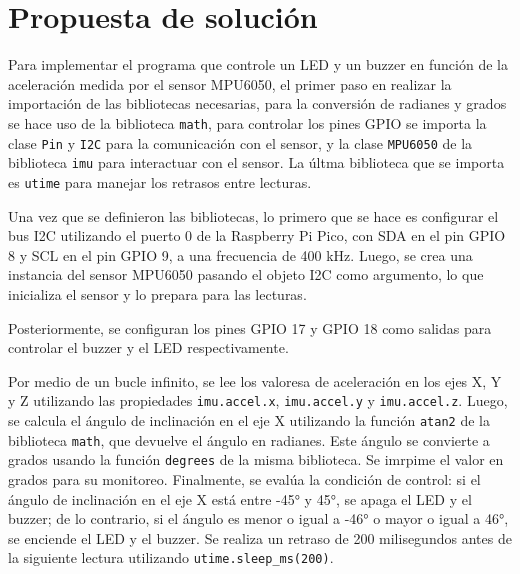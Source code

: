 \documentclass[letterpaper,12pt]{article}
\begin{document}
    \section*{Propuesta de solución}

    Para implementar el programa que controle un LED y un buzzer en función de la aceleración medida por el sensor MPU6050, el primer paso en realizar la importación de las bibliotecas necesarias, para la conversión de radianes y grados se hace uso de la biblioteca \texttt{math}, para controlar los pines GPIO se importa la clase \texttt{Pin} y \texttt{I2C} para la comunicación con el sensor, y la clase \texttt{MPU6050} de la biblioteca \texttt{imu} para interactuar con el sensor. La últma biblioteca que se importa es \texttt{utime} para manejar los retrasos entre lecturas.

    Una vez que se definieron las bibliotecas, lo primero que se hace es configurar el bus I2C utilizando el puerto 0 de la Raspberry Pi Pico, con SDA en el pin GPIO 8 y SCL en el pin GPIO 9, a una frecuencia de 400 kHz. Luego, se crea una instancia del sensor MPU6050 pasando el objeto I2C como argumento, lo que inicializa el sensor y lo prepara para las lecturas.

    Posteriormente, se configuran los pines GPIO 17 y GPIO 18 como salidas para controlar el buzzer y el LED respectivamente.

    Por medio de un bucle infinito, se lee los valoresa de aceleración en los ejes X, Y y Z utilizando las propiedades \texttt{imu.accel.x}, \texttt{imu.accel.y} y \texttt{imu.accel.z}. Luego, se calcula el ángulo de inclinación en el eje X utilizando la función \texttt{atan2} de la biblioteca \texttt{math}, que devuelve el ángulo en radianes. Este ángulo se convierte a grados usando la función \texttt{degrees} de la misma biblioteca. Se imrpime el valor en grados para su monitoreo. Finalmente, se evalúa la condición de control: si el ángulo de inclinación en el eje X está entre -45° y 45°, se apaga el LED y el buzzer; de lo contrario, si el ángulo es menor o igual a -46° o mayor o igual a 46°, se enciende el LED y el buzzer. Se realiza un retraso de 200 milisegundos antes de la siguiente lectura utilizando \texttt{utime.sleep\_ms(200)}.
\end{document}
